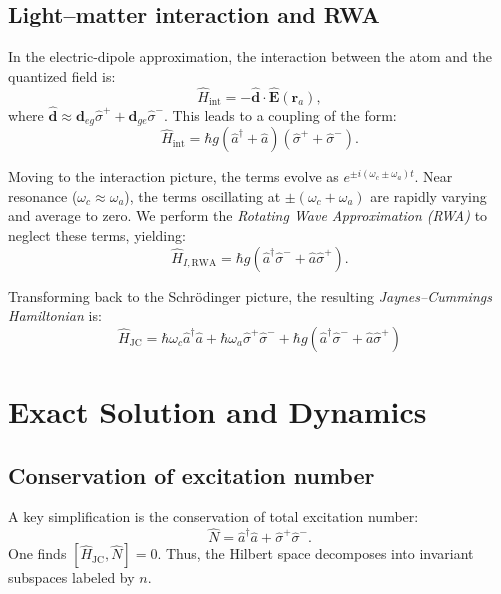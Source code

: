 \documentclass[11pt,a4paper]{article}
\newcommand{\hc}{\hat{a}}
\newcommand{\hcd}{\hat{a}^\dagger}
\newcommand{\sigmap}{\hat{\sigma}^+}
\newcommand{\sigmam}{\hat{\sigma}^-}
\newcommand{\HJC}{\hat{H}_{\text{JC}}}
\theoremstyle{definition}
\begin{document}
\subsection{Light--matter interaction and RWA}

In the electric-dipole approximation, the interaction between the atom and the quantized field is:
\begin{equation}
  \hat{H}_{\text{int}} = -\hat{\mathbf{d}}\cdot\hat{\mathbf{E}}(\mathbf{r}_a),
\end{equation}
where $\hat{\mathbf{d}} \approx \mathbf{d}_{eg} \sigmap + \mathbf{d}_{ge} \sigmam$.
This leads to a coupling of the form:
\begin{equation}
  \hat{H}_{\text{int}} = \hbar g \left(\hcd + \hc\right)\left(\sigmap + \sigmam\right).
\end{equation}

Moving to the interaction picture, the terms evolve as $e^{\pm i(\omega_c \pm \omega_a)t}$.
Near resonance ($\omega_c \approx \omega_a$), the terms oscillating at $\pm(\omega_c + \omega_a)$ are rapidly varying and average to zero.
We perform the \emph{Rotating Wave Approximation (RWA)} to neglect these terms, yielding:
\begin{equation}
  \hat{H}_{I,\text{RWA}} = \hbar g \left(\hcd \sigmam + \hc \sigmap\right).
\end{equation}

Transforming back to the Schr\"odinger picture, the resulting \emph{Jaynes--Cummings Hamiltonian} is:
\begin{equation}
  \boxed{
  \HJC = \hbar\omega_c \hcd \hc + \hbar\omega_a \sigmap\sigmam
  + \hbar g \left(\hcd \sigmam + \hc \sigmap\right)
  }
  \label{eq:jc_hamiltonian}
\end{equation}

\section{Exact Solution and Dynamics}
\label{sec:exact_solution}

\subsection{Conservation of excitation number}
A key simplification is the conservation of total excitation number:
\begin{equation}
  \hat{N} = \hcd \hc + \sigmap\sigmam.
\end{equation}
One finds $[\HJC, \hat{N}] = 0$. Thus, the Hilbert space decomposes into invariant subspaces labeled by $n$.
\end{document}
